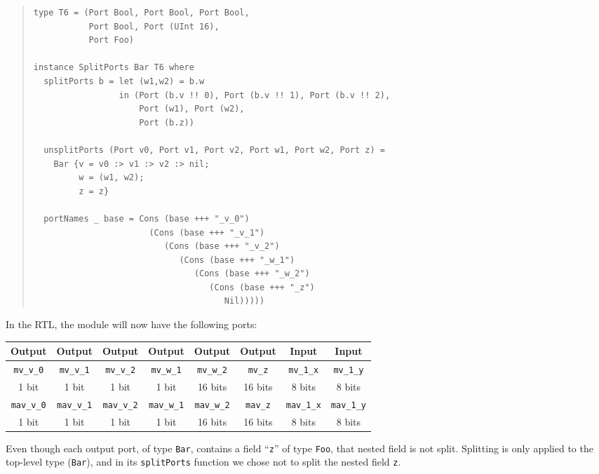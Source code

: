 \begin{quote}
\begin{verbatim}
type T6 = (Port Bool, Port Bool, Port Bool,
           Port Bool, Port (UInt 16),
           Port Foo)

instance SplitPorts Bar T6 where
  splitPorts b = let (w1,w2) = b.w
                 in (Port (b.v !! 0), Port (b.v !! 1), Port (b.v !! 2),
                     Port (w1), Port (w2),
                     Port (b.z))

  unsplitPorts (Port v0, Port v1, Port v2, Port w1, Port w2, Port z) =
    Bar {v = v0 :> v1 :> v2 :> nil;
         w = (w1, w2);
         z = z}

  portNames _ base = Cons (base +++ "_v_0")
                       (Cons (base +++ "_v_1")
                          (Cons (base +++ "_v_2")
                             (Cons (base +++ "_w_1")
                                (Cons (base +++ "_w_2")
                                   (Cons (base +++ "_z")
                                      Nil)))))
\end{verbatim}
\end{quote}

In the RTL, the module will now have the following ports:

\begin{center}
  \begin{tabular}{|c|c|c|c|c|c||c|c|}
    \hline
     Output &
     Output &
     Output &
     Output &
     Output &
     Output &
     Input  &
     Input  \\
    \hline
     {\tt mv\_v\_0}  &
     {\tt mv\_v\_1}  &
     {\tt mv\_v\_2}  &
     {\tt mv\_w\_1}  &
     {\tt mv\_w\_2}  &
     {\tt mv\_z}     &
     {\tt mv\_1\_x}  &
     {\tt mv\_1\_y} \\
      1 bit  &
      1 bit  &
      1 bit  &
      1 bit  &
     16 bits &
     16 bits &
      8 bits &
      8 bits \\
    \hline
     {\tt mav\_v\_0}  &
     {\tt mav\_v\_1}  &
     {\tt mav\_v\_2}  &
     {\tt mav\_w\_1}  &
     {\tt mav\_w\_2}  &
     {\tt mav\_z}     &
     {\tt mav\_1\_x}  &
     {\tt mav\_1\_y} \\
      1 bit  &
      1 bit  &
      1 bit  &
      1 bit  &
     16 bits &
     16 bits &
      8 bits &
      8 bits \\
    \hline
  \end{tabular}
\end{center}

Even though each output port, of type {\tt Bar}, contains a field
``{\tt z}'' of type {\tt Foo}, that nested field is not split.
Splitting is only applied to the top-level type ({\tt Bar}), and in
its {\tt splitPorts} function we chose not to split the nested field
{\tt z}.

